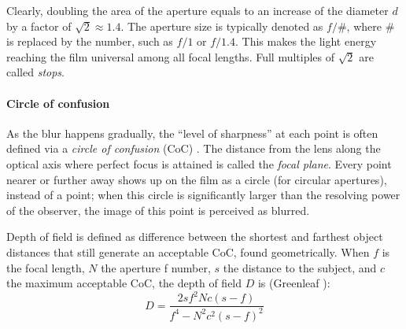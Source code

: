 Clearly, doubling the area of the aperture equals to an increase of the diameter $d$ by a factor of $\sqrt 2 \approx 1.4$.
The aperture size is typically denoted as $f/\#$, where $\#$ is replaced by the number, such as $f/1$ or $f/1.4$.
This makes the light energy reaching the film universal among all focal lengths.
Full multiples of $\sqrt 2$ are called \emph{stops}.
\cite{szeliski10vision}

\paragraph{Circle of confusion}
As the blur happens gradually, the ``level of sharpness'' at each point is often defined via a \emph{circle of confusion} (CoC) \cite{greenleaf1950photographic}.
The distance from the lens along the optical axis where perfect focus is attained is called the \emph{focal plane}.
Every point nearer or further away shows up on the film as a circle (for circular apertures), instead of a point; when this circle is significantly larger than the resolving power of the observer, the image of this point is perceived as blurred.

Depth of field is defined as difference between the shortest and farthest object distances that still generate an acceptable CoC, found geometrically.
When $f$ is the focal length, $N$ the aperture f number, $s$ the distance to the subject, and $c$ the maximum acceptable CoC, the depth of field $D$ is (Greenleaf \cite{greenleaf1950photographic}):
\begin{equation} \label{eq:dof}
	D = \frac{2 s f^2 N c (s - f)} {f^4 - N^2 c^2 (s - f)^2}
\end{equation}


